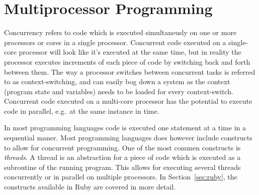 \section{Multiprocessor Programming} %
\label{sec:multiprocessor}
Concurrency refers to code which is executed simultaneusly on one or more processors or cores in a single processor. Concurrent code executed on a single-core processor will look like it's executed at the same time, but in reality the processor executes increments of each piece of code by switching back and forth between them. The way a processor switches between concurrent tasks is referred to as context-switching, and can easily bog down a system as the context (program state and variables) needs to be loaded for every context-switch. 
Concurrent code executed on a multi-core processor has the potential to execute code in parallel, e.g.\ at the same instance in time.

In most programming languages code is executed one statement at a time in a sequential maner. Most programming languages does however include constructs to allow for concurrent programming. 
One of the most commen constructs is \textit{threads}. A thread is an abstraction for a piece of code which is executed as a subroutine of the running program. This allows for executing several threads concurrently or in parallel on multiple processors. 
In Section~\ref{sec:ruby}, the constructs available in Ruby are covered in more detail.


